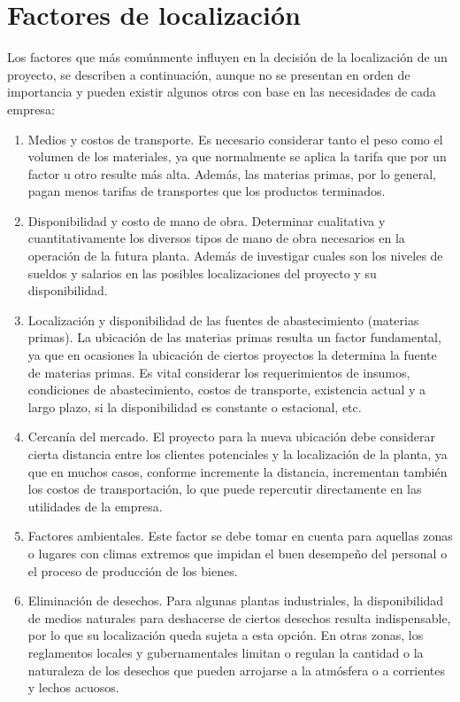 \documentclass[../main]{subfiles}
\begin{document}
\section{Factores de localización}
Los factores que más comúnmente influyen en la decisión de la localización de
un proyecto, se describen a continuación, aunque no se presentan en orden de
importancia y pueden existir algunos otros con base en las necesidades de cada
empresa:
\begin{enumerate}
  \item Medios y costos de transporte. Es necesario considerar tanto el peso
    como el volumen de los materiales, ya que normalmente se aplica la
    tarifa que por un factor u otro resulte más alta. Además, las materias
    primas, por lo general, pagan menos tarifas de transportes que los
    productos terminados.
  \item Disponibilidad y costo de mano de obra. Determinar cualitativa y
    cuantitativamente los diversos tipos de mano de obra necesarios en la
    operación de la futura planta. Además de investigar cuales son los
    niveles de sueldos y salarios en las posibles localizaciones del proyecto y
    su disponibilidad.
  \item Localización y disponibilidad de las fuentes de abastecimiento
    (materias primas). La ubicación de las materias primas resulta un factor
    fundamental, ya que en ocasiones la ubicación de ciertos proyectos la
    determina la fuente de materias primas. Es vital considerar los
    requerimientos de insumos, condiciones de abastecimiento, costos de
    transporte, existencia actual y a largo plazo, si la disponibilidad es
    constante o estacional, etc.
  \item Cercanía del mercado. El proyecto para la nueva ubicación debe
    considerar cierta distancia entre los clientes potenciales y la localización
    de la planta, ya que en muchos casos, conforme incremente la distancia,
    incrementan también los costos de transportación, lo que puede
    repercutir directamente en las utilidades de la empresa.
  \item Factores ambientales. Este factor se debe tomar en cuenta para
    aquellas zonas o lugares con climas extremos que impidan el buen
    desempeño del personal o el proceso de producción de los bienes.
  \item Eliminación de desechos. Para algunas plantas industriales, la
    disponibilidad de medios naturales para deshacerse de ciertos desechos
    resulta indispensable, por lo que su localización queda sujeta a esta
    opción. En otras zonas, los reglamentos locales y gubernamentales
    limitan o regulan la cantidad o la naturaleza de los desechos que pueden
    arrojarse a la atmósfera o a corrientes y lechos acuosos.


\end{enumerate}
\end{document}
